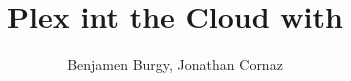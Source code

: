 \documentclass[french]{msereport}
\title{Plex int the Cloud with \aws}
\author{Benjamen Burgy, Jonathan Cornaz}
\begin{document}
	\appendixsection
		
		\listoffigures
		
		\listoftables
		
\end{document}
